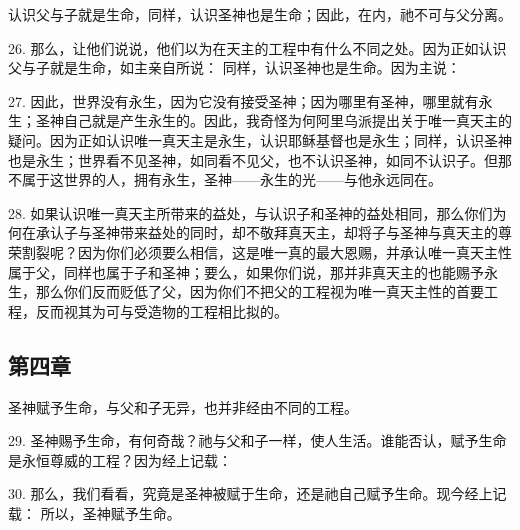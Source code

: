 认识父与子就是生命，同样，认识圣神也是生命；因此，在内，祂不可与父分离。\par

26. 那么，让他们说说，他们以为在天主的工程中有什么不同之处。因为正如认识父与子就是生命，如主亲自所说： 同样，认识圣神也是生命。因为主说：\par

27. 因此，世界没有永生，因为它没有接受圣神；因为哪里有圣神，哪里就有永生；圣神自己就是产生永生的。因此，我奇怪为何阿里乌派提出关于唯一真天主的疑问。因为正如认识唯一真天主是永生，认识耶稣基督也是永生；同样，认识圣神也是永生；世界看不见圣神，如同看不见父，也不认识圣神，如同不认识子。但那不属于这世界的人，拥有永生，圣神——永生的光——与他永远同在。\par

28. 如果认识唯一真天主所带来的益处，与认识子和圣神的益处相同，那么你们为何在承认子与圣神带来益处的同时，却不敬拜真天主，却将子与圣神与真天主的尊荣割裂呢？因为你们必须要么相信，这是唯一真的最大恩赐，并承认唯一真天主性属于父，同样也属于子和圣神；要么，如果你们说，那并非真天主的也能赐予永生，那么你们反而贬低了父，因为你们不把父的工程视为唯一真天主性的首要工程，反而视其为可与受造物的工程相比拟的。\par


\subsection{第四章}

圣神赋予生命，与父和子无异，也并非经由不同的工程。\par

29. 圣神赐予生命，有何奇哉？祂与父和子一样，使人生活。谁能否认，赋予生命是永恒尊威的工程？因为经上记载：\par

30. 那么，我们看看，究竟是圣神被赋于生命，还是祂自己赋予生命。现今经上记载： 所以，圣神赋予生命。\par


